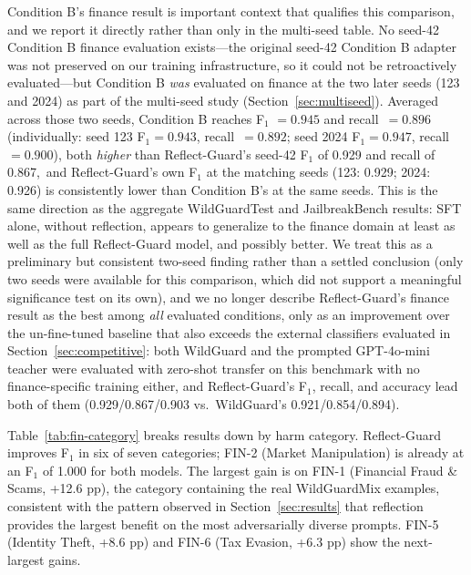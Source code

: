 \documentclass[superintelligence,article,accept,moreauthors]{Definitions/mdpi}
\begin{document}
Condition B's finance result is important context that qualifies this comparison, and we report it directly rather than only in the multi-seed table. No seed-42 Condition B finance evaluation exists---the original seed-42 Condition B adapter was not preserved on our training infrastructure, so it could not be retroactively evaluated---but Condition B \emph{was} evaluated on finance at the two later seeds (123 and 2024) as part of the multi-seed study (Section~\ref{sec:multiseed}). Averaged across those two seeds, Condition B reaches F$_1$ $=0.945$ and \mbox{recall $=0.896$} (individually: seed 123 F$_1$$=0.943$, \mbox{recall $=0.892$;} seed 2024 F$_1$$=0.947$, \mbox{recall $=0.900$}), both \emph{higher} than Reflect-Guard's seed-42 F$_1$ of 0.929 and recall of \mbox{0.867, and} Reflect-Guard's own F$_1$ at the matching seeds (123: 0.929; 2024: 0.926) is consistently lower than Condition B's at the same seeds. This is the same direction as the aggregate WildGuardTest and JailbreakBench results: SFT alone, without reflection, appears to generalize to the finance domain at least as well as the full Reflect-Guard model, and possibly better. We treat this as a preliminary but consistent two-seed finding rather than a settled conclusion (only two seeds were available for this comparison, which did not support a meaningful significance test on its own), and we no longer describe Reflect-Guard's finance result as the best among \emph{all} evaluated conditions, only as an improvement over the un-fine-tuned baseline that also exceeds the external classifiers evaluated in Section~\ref{sec:competitive}: both WildGuard and the prompted GPT-4o-mini teacher were evaluated with zero-shot transfer on this benchmark with no finance-specific training either, and Reflect-Guard's F$_1$, recall, and accuracy lead both of them (0.929/0.867/0.903 vs.\ WildGuard's 0.921/0.854/0.894). %


Table~\ref{tab:fin-category} breaks results down by harm category. Reflect-Guard improves F$_1$ in six of seven categories; FIN-2 (Market Manipulation) is already at an F$_1$ of 1.000 for both models. The largest gain is on FIN-1 (Financial Fraud \& Scams, +12.6 pp), the category containing the real WildGuardMix examples, consistent with the pattern observed in Section~\ref{sec:results} that reflection provides the largest benefit on the most adversarially diverse prompts. FIN-5 (Identity Theft, +8.6 pp) and FIN-6 (Tax Evasion, +6.3 pp) show the next-largest gains.
\end{document}
